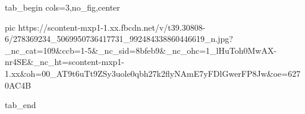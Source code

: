  
 
 
 
 


\ifcmt
  tab_begin cols=3,no_fig,center

     pic https://scontent-mxp1-1.xx.fbcdn.net/v/t39.30808-6/278369234_5069950736417731_992484338860446619_n.jpg?_nc_cat=109&ccb=1-5&_nc_sid=8bfeb9&_nc_ohc=1_lHuToh0MwAX-nr4SE&_nc_ht=scontent-mxp1-1.xx&oh=00_AT9t6uTt9ZSy3uole0qbh27k2flyNAmE7yFDlGwerFP8Jw&oe=6270AC4B

  tab_end
\fi
